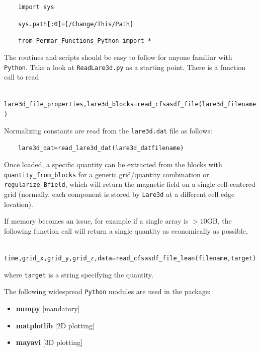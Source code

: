 \documentclass[12pt,twoside]{article}
\begin{document}
$\quad\quad$\texttt{import sys}

$\quad\quad$\texttt{sys.path[:0]=[\textquotesingle /Change/This/Path\textquotesingle ]}

$\quad\quad$\texttt{from Permar\_Functions\_Python import *}

\vspace{2mm}

The routines and scripts should be easy to follow for anyone familiar with \texttt{Python}. Take a look at \texttt{ReadLare3d.py} as a starting point. There is a function call to read 

$\quad\quad$\texttt{lare3d\_file\_properties,lare3d\_blocks=read\_cfsasdf\_file(lare3d\_filename)}

Normalizing constants are read from the \texttt{lare3d.dat} file as follows:

$\quad\quad$\texttt{lare3d\_dat=read\_lare3d\_dat(lare3d\_datfilename)}

Once loaded, a specific quantity can be extracted from the blocks with \texttt{quantity\_from\_blocks} for a generic grid/quantity combination or \texttt{regularize\_Bfield}, which will return the magnetic field on a single cell-centered grid (normally, each component is stored by \texttt{Lare3d} at a different cell edge location).

\vspace{2mm}

If memory becomes an issue, for example if a single array is $>10$GB, the following function call will return a single quantity as economically as possible,

$\quad\quad$\texttt{time,grid\_x,grid\_y,grid\_z,data=read\_cfsasdf\_file\_lean(filename,target)}

where \texttt{target} is a string specifying the quantity.

\vspace{2mm}
\newpage

The following widespread \texttt{Python} modules are used in the package:

\vspace{-3mm}

\begin{itemize}
\setlength\itemsep{-2mm}
  \item \textbf{numpy} [mandatory]
  \item \textbf{matplotlib} [2D plotting]
  \item \textbf{mayavi} [3D plotting]
\end{itemize}
\end{document}
